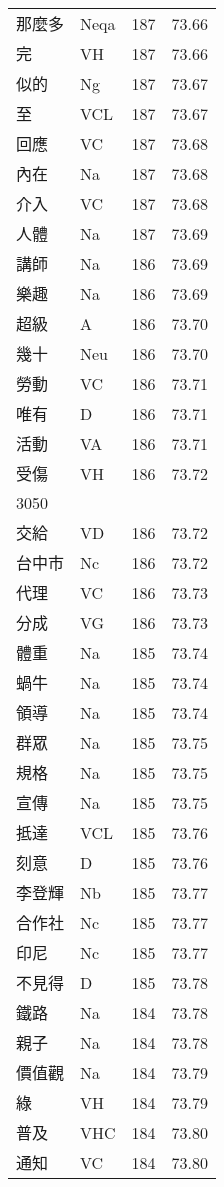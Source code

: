 \documentclass[twocolumn]{book}
\begin{document}
\begin{supertabular}{llrr}
那麼多 & Neqa & 187 &  73.66\\
完 & VH & 187 &  73.66\\
似的 & Ng & 187 &  73.67\\
至 & VCL & 187 &  73.67\\
回應 & VC & 187 &  73.68\\
內在 & Na & 187 &  73.68\\
介入 & VC & 187 &  73.68\\
人體 & Na & 187 &  73.69\\
講師 & Na & 186 &  73.69\\
樂趣 & Na & 186 &  73.69\\
超級 & A & 186 &  73.70\\
幾十 & Neu & 186 &  73.70\\
勞動 & VC & 186 &  73.71\\
唯有 & D & 186 &  73.71\\
活動 & VA & 186 &  73.71\\
受傷 & VH & 186 &  73.72\\
3050\\
交給 & VD & 186 &  73.72\\
台中市 & Nc & 186 &  73.72\\
代理 & VC & 186 &  73.73\\
分成 & VG & 186 &  73.73\\
體重 & Na & 185 &  73.74\\
蝸牛 & Na & 185 &  73.74\\
領導 & Na & 185 &  73.74\\
群眾 & Na & 185 &  73.75\\
規格 & Na & 185 &  73.75\\
宣傳 & Na & 185 &  73.75\\
抵達 & VCL & 185 &  73.76\\
刻意 & D & 185 &  73.76\\
李登輝 & Nb & 185 &  73.77\\
合作社 & Nc & 185 &  73.77\\
印尼 & Nc & 185 &  73.77\\
不見得 & D & 185 &  73.78\\
鐵路 & Na & 184 &  73.78\\
親子 & Na & 184 &  73.78\\
價值觀 & Na & 184 &  73.79\\
綠 & VH & 184 &  73.79\\
普及 & VHC & 184 &  73.80\\
通知 & VC & 184 &  73.80\\

\end{supertabular}
\end{document}
